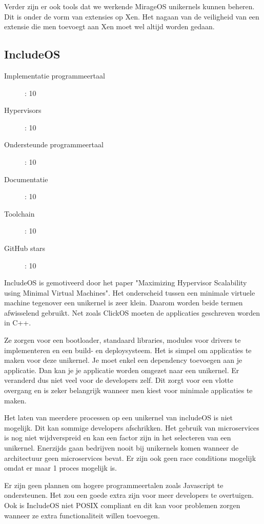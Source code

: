 \documentclass[pdftex,a4paper,12pt,twoside]{report}
\begin{document}
Verder zijn er ook tools dat we werkende MirageOS unikernels kunnen beheren. Dit is onder de vorm van extensies op Xen. Het nagaan van de veiligheid van een extensie die men toevoegt aan Xen moet wel altijd worden gedaan.

\subsection{IncludeOS}

\begin{description}
  \item [Implementatie programmeertaal]: 10
  \item [Hypervisors]: 10
  \item [Ondersteunde programmeertaal]: 10
  \item [Documentatie]: 10
  \item [Toolchain]: 10
  \item [GitHub stars]: 10
\end{description}

IncludeOS is gemotiveerd door het paper "Maximizing Hypervisor Scalability using Minimal Virtual Machines". Het onderscheid tussen een minimale virtuele machine tegenover een unikernel is zeer klein. Daarom worden beide termen afwisselend gebruikt. Net zoals ClickOS moeten de applicaties geschreven worden in C++.

Ze zorgen voor een bootloader, standaard libraries, modules voor drivers te implementeren en een build- en deploysysteem. Het is simpel om applicaties te maken voor deze unikernel. Je moet enkel een dependency toevoegen aan je applicatie. Dan kan je je applicatie worden omgezet naar een unikernel. Er veranderd dus niet veel voor de developers zelf. Dit zorgt voor een vlotte overgang en is zeker belangrijk wanneer men kiest voor minimale applicaties te maken.

Het laten van meerdere processen op een unikernel van includeOS is niet mogelijk. Dit kan sommige developers afschrikken. Het gebruik van microservices is nog niet wijdverspreid en kan een factor zijn in het selecteren van een unikernel. Enerzijds gaan bedrijven nooit bij unikernels komen wanneer de architectuur geen microservices bevat. Er zijn ook geen race conditions mogelijk omdat er maar 1 proces mogelijk is.

Er zijn geen plannen om hogere programmeertalen zoals Javascript te ondersteunen. Het zou een goede extra zijn voor meer developers te overtuigen. Ook is IncludeOS niet POSIX compliant en dit kan voor problemen zorgen wanneer ze extra functionaliteit willen toevoegen. 
\end{document}
